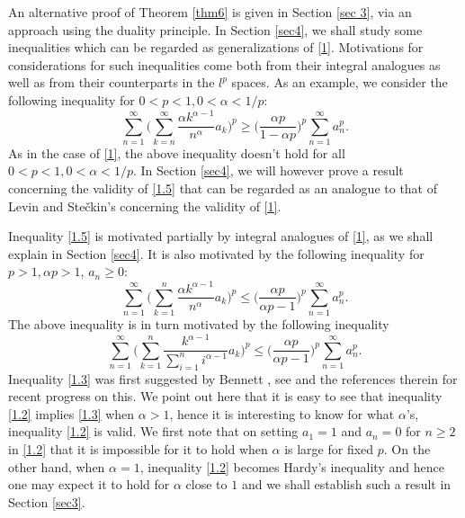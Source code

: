 \documentclass[11pt]{amsart}
\numberwithin{equation}{section}
\theoremstyle{definition}
\theoremstyle{remark}
\begin{document}
     An alternative proof of Theorem \ref{thm6} is given in Section \ref{sec 3},
     via an approach using the duality principle. In Section \ref{sec4}, we shall study some inequalities
     which can be regarded as generalizations of \eqref{1}.
     Motivations for considerations for such inequalities
     come both from their integral analogues as well as from their
     counterparts in the $l^p$ spaces. As an example, we consider the following inequality for $0<p<1, 0<\alpha<1/p$:
\begin{equation}
\label{1.5}
   \sum^{\infty}_{n=1} \Big(
\sum^{\infty}_{k=n}\frac {\alpha k^{\alpha-1}}{n^{\alpha}}a_k \Big
  )^p \geq \Big ( \frac {\alpha p}{1-\alpha p} \Big )^p \sum^{\infty}_{n=1}a^p_n.
\end{equation}
    As in the case of \eqref{1}, the above inequality doesn't hold for all $0<p<1,
    0<\alpha<1/p$. In Section \ref{sec4}, we will however prove a result concerning the validity of \eqref{1.5} that can be regarded
     as an analogue to
    that of Levin and Ste\v ckin's concerning the validity of
    \eqref{1}.

    Inequality \eqref{1.5} is motivated partially by integral
    analogues of \eqref{1}, as we shall explain in Section
    \ref{sec4}. It is also motivated by the following inequality
    for $p>1, \alpha p>1$, $a_n \geq 0$:
\begin{equation}
\label{1.2}
  \sum^{\infty}_{n=1}\Big ( \sum^n_{k=1}\frac {\alpha
  k^{\alpha-1}}{n^{\alpha}}a_k \Big )^p \leq \Big (\frac
  {\alpha p}{\alpha p-1} \Big )^p\sum^{\infty}_{n=1}a^p_n.
\end{equation}
    The above inequality is in turn motivated by the following inequality
\begin{equation}
\label{1.3}
  \sum^{\infty}_{n=1}\Big ( \sum^n_{k=1}\frac {
  k^{\alpha-1}}{\sum^n_{i=1}i^{\alpha-1}}a_k \Big )^p \leq \Big (\frac
  {\alpha p}{\alpha p-1} \Big )^p\sum^{\infty}_{n=1}a^p_n.
\end{equation}
   Inequality \eqref{1.3} was first suggested by Bennett \cite[p.
   40-41]{B4}, see \cite{G8} and the references therein for recent
   progress on this. We point out here that it is easy to see that inequality
   \eqref{1.2} implies \eqref{1.3} when $\alpha>1$, hence it is
   interesting to know for what $\alpha$'s, inequality \eqref{1.2} is valid. We first note that on setting $a_1=1$ and $a_n=0$
   for $n \geq 2$ in \eqref{1.2} that it is impossible for it to
   hold when $\alpha$ is large for fixed $p$. On the other hand,
   when $\alpha=1$, inequality \eqref{1.2} becomes Hardy's
   inequality and hence one may expect it to hold for $\alpha$
   close to $1$ and we shall
   establish such a result in Section
   \ref{sec3}.
\end{document}
